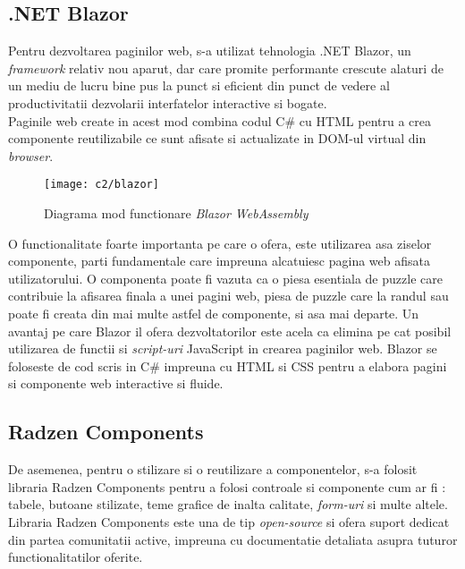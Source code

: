\subsection*{.NET Blazor}
Pentru dezvoltarea paginilor web, s-a utilizat tehnologia .NET Blazor, un \textit{framework} relativ nou aparut, dar care promite performante crescute alaturi de un mediu de lucru bine pus la punct si eficient din punct de vedere al productivitatii dezvolarii interfatelor interactive si bogate.\\
Paginile web create in acest mod combina codul C\# cu HTML pentru a crea componente reutilizabile ce sunt  afisate si actualizate in DOM-ul virtual din \textit{browser}.\\

\vspace{1cm}
\begin{figure}[h]
	\centering
	
	\texttt{[image: c2/blazor]}
	\caption{Diagrama mod functionare \textit{Blazor WebAssembly}}
\end{figure}

O functionalitate foarte importanta pe care o ofera, este utilizarea asa ziselor componente, parti fundamentale care impreuna alcatuiesc pagina web afisata utilizatorului. O componenta poate fi vazuta ca o piesa esentiala de puzzle care contribuie la afisarea finala a unei pagini web, piesa de puzzle care la randul sau poate fi creata din mai multe astfel de componente, si asa mai departe.
Un avantaj pe care Blazor il ofera dezvoltatorilor este acela ca elimina pe cat posibil utilizarea de functii si \textit{script-uri }JavaScript in crearea paginilor web. Blazor se foloseste de cod scris in C\# impreuna cu HTML si CSS pentru a elabora pagini si componente web interactive si fluide.\\

\subsection*{Radzen Components}
De asemenea, pentru o stilizare si o reutilizare a componentelor, s-a folosit libraria Radzen Components pentru a folosi controale si componente cum ar fi : tabele, butoane stilizate, teme grafice de inalta calitate, \textit{form-uri} si multe altele.\\
 Libraria Radzen Components este una de tip \textit{open-source} si ofera suport dedicat din partea comunitatii active, impreuna cu documentatie detaliata asupra tuturor functionalitatilor oferite.


